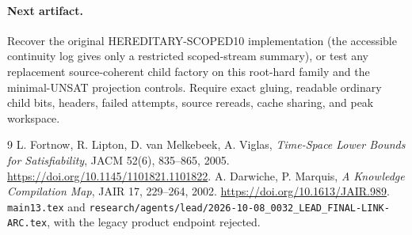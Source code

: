 \documentclass[11pt]{article}
\begin{document}
\paragraph{Next artifact.}
Recover the original HEREDITARY-SCOPED10 implementation (the
accessible continuity log gives only a restricted scoped-stream
summary), or test any replacement source-coherent child factory on
this root-hard family and the minimal-UNSAT projection controls.
Require exact gluing, readable ordinary child bits, headers,
failed attempts, source rereads, cache sharing, and peak workspace.

\begin{thebibliography}{9}
 L. Fortnow, R. Lipton, D. van Melkebeek,
A. Viglas, \emph{Time-Space Lower Bounds for Satisfiability},
JACM 52(6), 835--865, 2005.
\url{https://doi.org/10.1145/1101821.1101822}.
 A. Darwiche, P. Marquis,
\emph{A Knowledge Compilation Map}, JAIR 17, 229--264, 2002.
\url{https://doi.org/10.1613/JAIR.989}.
 \texttt{main13.tex} and
\texttt{research/agents/lead/2026-10-08\_0032\_LEAD\_FINAL-LINK-ARC.tex},
with the legacy product endpoint rejected.
\end{thebibliography}
\end{document}
